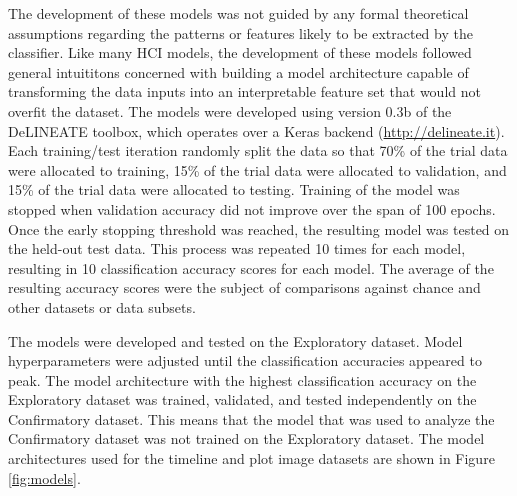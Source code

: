 \documentclass[
  english,
  man,floatsintext]{apa6}
\begin{document}
The development of these models was not guided by any formal theoretical assumptions regarding the patterns or features likely to be extracted by the classifier. Like many HCI models, the development of these models followed general intuititons concerned with building a model architecture capable of transforming the data inputs into an interpretable feature set that would not overfit the dataset. The models were developed using version 0.3b of the DeLINEATE toolbox, which operates over a Keras backend (\url{http://delineate.it}). Each training/test iteration randomly split the data so that 70\% of the trial data were allocated to training, 15\% of the trial data were allocated to validation, and 15\% of the trial data were allocated to testing. Training of the model was stopped when validation accuracy did not improve over the span of 100 epochs. Once the early stopping threshold was reached, the resulting model was tested on the held-out test data. This process was repeated 10 times for each model, resulting in 10 classification accuracy scores for each model. The average of the resulting accuracy scores were the subject of comparisons against chance and other datasets or data subsets.

The models were developed and tested on the Exploratory dataset. Model hyperparameters were adjusted until the classification accuracies appeared to peak. The model architecture with the highest classification accuracy on the Exploratory dataset was trained, validated, and tested independently on the Confirmatory dataset. This means that the model that was used to analyze the Confirmatory dataset was not trained on the Exploratory dataset. The model architectures used for the timeline and plot image datasets are shown in Figure \ref{fig:models}.
\end{document}
